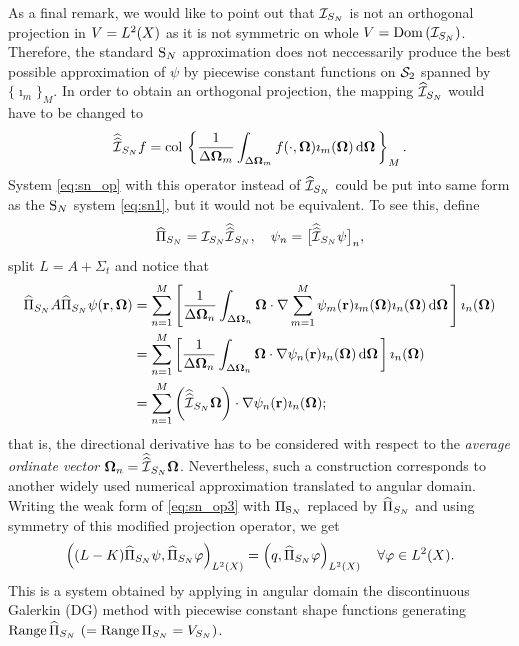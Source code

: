 As a final remark, we would like to point out that $\PiSN$ is not an orthogonal projection in $V = \Lp[2](X)$ as it is
not symmetric on whole $V = \Dom \PiSN$. Therefore, the standard $\SN$ approximation does not neccessarily produce the best possible
approximation of $\psi$ by piecewise constant functions on $\Sphere$ spanned by $\{\imath_m\}_M$. In order to
obtain an orthogonal projection, the mapping $\PihSN$ would have to be changed to 
$$
	\widehat{\widehat{\mathcal{I}}}_{S_N} f = \col\left\{\frac{1}{\Delta\bomega_m}\int_{\Delta\bomega_m}f(\cdot,\bomega)
	\imath_m(\bomega)\,\d{\bomega}\right\}_{\idxset{M}}.
$$
System \eqref{eq:sn_op} with this operator instead of $\PihSN$ could be put into same form as the $\SN$ system
\eqref{eq:sn1}, but it would not be equivalent. To see this, define 
$$
	\widehat\Proj_{S_N} = \PiSN\widehat{\widehat{\mathcal{I}}}_{S_N},\quad \psi_n =
	\bigl[\widehat{\widehat{\mathcal{I}}}_{S_N}\psi\bigr]_n, 
$$ 
split $L = A + \Sigma_t$ and notice that
$$
\begin{aligned}
	\widehat\Proj_{S_N} A \widehat\Proj_{S_N} \psi(\br,\bomega) &= \sum_{n=1}^M  
	\left[\frac{1}{\Delta\bomega_n}\int_{\Delta\bomega_n}\bomega\cdot\nabla \sum_{m=1}^M
	\psi_m(\br) \imath_m(\bomega)\imath_n(\bomega)\,\d{\bomega}\right] \imath_n(\bomega)\\
	& = \sum_{n=1}^M  
	\left[\frac{1}{\Delta\bomega_n}\int_{\Delta\bomega_n}\bomega\cdot\nabla 
	\psi_n(\br) \imath_n(\bomega)\,\d{\bomega}\right] \imath_n(\bomega)\\
	& = \sum_{n=1}^M \left(\widehat{\widehat{\mathcal{I}}}_{S_N}\bomega\right)  \cdot\nabla 
	\psi_n(\br) \imath_n(\bomega);
\end{aligned}
$$
that is, the directional derivative has to be considered with respect to the \textit{average ordinate vector}
$\bomega_n = \widehat{\widehat{\mathcal{I}}}_{S_N}\bomega$. Nevertheless, such a construction corresponds to another
widely used numerical approximation translated to angular domain.  Writing the weak form of \eqref{eq:sn_op3} with
$\Projop[\SN]$ replaced by $\widehat\Proj_{S_N}$ and using symmetry of this modified projection operator, we get
\begin{equation}\label{eq:SN_weak}
	\left((\op{L}  - \op{K})\widehat\Proj_{S_N} \psi, \widehat\Proj_{S_N} \varphi \right)_{\Lp[2](X)} = \left( q,
	\widehat\Proj_{S_N} \varphi \right)_{\Lp[2](X)}\quad \forall \varphi\in \Lp[2](X). 
\end{equation}
This is a system obtained by applying in angular domain the discontinuous Galerkin (DG) method
 with piecewise constant shape functions generating \linebreak
\mbox{$\Rng \widehat\Proj_{S_N}\ (= \Rng \Projop[S_N] = V_{S_N})$}.  %
 
